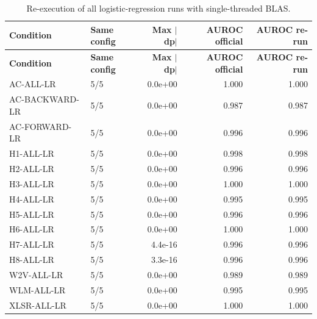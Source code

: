 \documentclass[10pt,a4paper]{article}
\begin{document}
\begin{center}\tiny\renewcommand{\arraystretch}{1.12}
\begin{longtable}{llrrr}
\caption{Re-execution of all logistic-regression runs with single-threaded BLAS.}\\
\toprule
\textbf{Condition} & \textbf{Same config} & \textbf{Max $|$dp$|$} & \textbf{AUROC official} & \textbf{AUROC re-run}\\\midrule\endfirsthead
\toprule
\textbf{Condition} & \textbf{Same config} & \textbf{Max $|$dp$|$} & \textbf{AUROC official} & \textbf{AUROC re-run}\\\midrule\endhead
\bottomrule\endfoot
AC-ALL-LR & 5/5 & 0.0e+00 & 1.000 & 1.000\\
AC-BACKWARD-LR & 5/5 & 0.0e+00 & 0.987 & 0.987\\
AC-FORWARD-LR & 5/5 & 0.0e+00 & 0.996 & 0.996\\
H1-ALL-LR & 5/5 & 0.0e+00 & 0.998 & 0.998\\
H2-ALL-LR & 5/5 & 0.0e+00 & 0.996 & 0.996\\
H3-ALL-LR & 5/5 & 0.0e+00 & 1.000 & 1.000\\
H4-ALL-LR & 5/5 & 0.0e+00 & 0.995 & 0.995\\
H5-ALL-LR & 5/5 & 0.0e+00 & 0.996 & 0.996\\
H6-ALL-LR & 5/5 & 0.0e+00 & 1.000 & 1.000\\
H7-ALL-LR & 5/5 & 4.4e-16 & 0.996 & 0.996\\
H8-ALL-LR & 5/5 & 3.3e-16 & 0.996 & 0.996\\
W2V-ALL-LR & 5/5 & 0.0e+00 & 0.989 & 0.989\\
WLM-ALL-LR & 5/5 & 0.0e+00 & 0.995 & 0.995\\
XLSR-ALL-LR & 5/5 & 0.0e+00 & 1.000 & 1.000\\
\end{longtable}\end{center}
\end{document}
